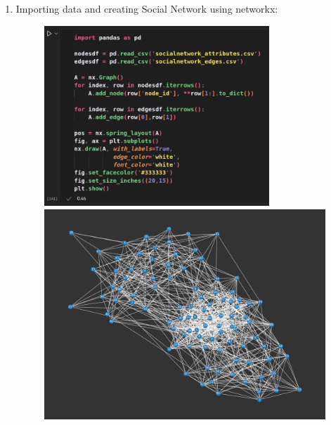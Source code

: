 \documentclass{article}
\begin{document}
    \begin{enumerate}[label=(\alph*), left=10pt, itemsep=10pt]
        
        \item \begin{minipage}[t]{0.9\textwidth}
            Importing data and creating Social Network using networkx:
            \begin{figure}[H]
                \centering
                \includegraphics[width=0.8\textwidth, height=0.3\textheight]{./2a.png}
                \includegraphics[width=1\textwidth, height=0.4\textheight]{./2ai.png}
            \end{figure}
        \end{minipage}


\end{enumerate}
\end{document}
